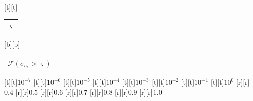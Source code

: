 %    
%
%
\begin{psfrags}%
\psfragscanon%
%
[t][t]{\color[rgb]{0,0,0}\setlength{\tabcolsep}{0pt}\begin{tabular}{c}{\Large$\varsigma$}\end{tabular}}%
[b][b]{\color[rgb]{0,0,0}\setlength{\tabcolsep}{0pt}\begin{tabular}{c}{\Large$\mathcal{F}(\sigma_{a_\ast} > \varsigma)$}\end{tabular}}%
%
[t][t]{$10^{-7}$}%
[t][t]{$10^{-6}$}%
[t][t]{$10^{-5}$}%
[t][t]{$10^{-4}$}%
[t][t]{$10^{-3}$}%
[t][t]{$10^{-2}$}%
[t][t]{$10^{-1}$}%
[t][t]{$10^{0}$}%
%
[r][r]{$0.4$}%
[r][r]{$0.5$}%
[r][r]{$0.6$}%
[r][r]{$0.7$}%
[r][r]{$0.8$}%
[r][r]{$0.9$}%
[r][r]{$1.0$}%
%
%
\end{psfrags}%
%
